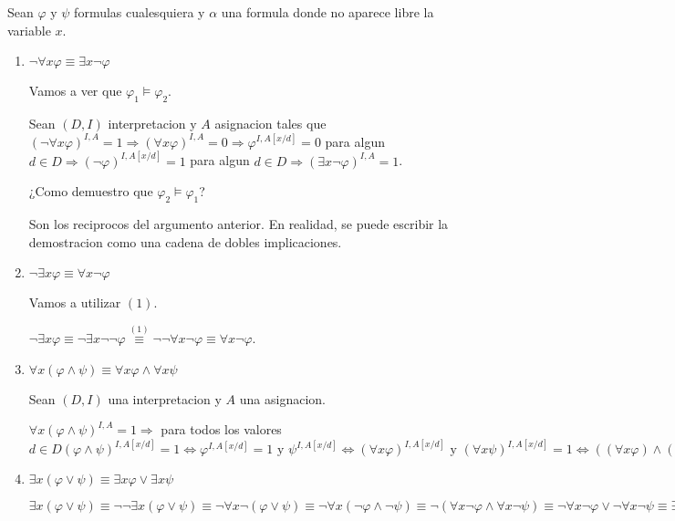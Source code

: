 \begin{example}
	Sean \(\varphi\) y \(\psi \) formulas cualesquiera y \(\alpha\) una formula donde no aparece libre la variable \(x\).
	\begin{enumerate}
		\item \(\neg \forall x \varphi \equiv \exists x \neg \varphi\)

		      Vamos a ver que \(\varphi_1 \vDash \varphi_2 \).

		      Sean \((D,I )\) interpretacion y \(A \) asignacion tales que \((\neg \forall x \varphi)^{I,A} = 1 \Rightarrow (\forall x \varphi)^{I,A} = 0 \Rightarrow \varphi^{I,A[x / d]} = 0 \) para algun \(d \in D \Rightarrow (\neg \varphi)^{I,A[x / d]} = 1 \) para algun \(d \in D \Rightarrow (\exists x \neg \varphi)^{I,A} = 1 \).

		      ¿Como demuestro que \(\varphi_2 \vDash \varphi_1\)?

		      Son los reciprocos del argumento anterior. En realidad, se puede escribir la demostracion como una cadena de dobles implicaciones.

		\item \(\neg \exists x \varphi \equiv \forall x \neg \varphi\)

		      Vamos a utilizar \((1)\).

		      \(\neg \exists x \varphi \equiv \neg \exists x \neg \neg \varphi \overset{(1)}{\equiv} \neg \neg \forall x \neg \varphi \equiv \forall x \neg \varphi\).

		\item \(\forall x (\varphi \wedge \psi) \equiv \forall x \varphi \wedge \forall x \psi \)

		      Sean \((D,I )\) una interpretacion y \(A \) una asignacion.

		      \(\forall  x (\varphi \wedge  \psi)^{I,A} = 1 \Rightarrow \) para todos los valores \(d \in D (\varphi \wedge \psi)^{I,A[x / d]} = 1 \iff \varphi^{I,A[x / d]} = 1 \text{ y } \psi^{I,A[x / d ]} \iff (\forall x \varphi)^{I,A[x / d]} \text{ y } (\forall  x \psi)^{I,A[x / d ]} = 1 \iff ((\forall x \varphi) \wedge (\forall x \psi))^{I,A} = 1      \)

		\item \(\exists  x (\varphi \vee \psi ) \equiv \exists x \varphi \vee  \exists  x \psi \)

		      \(\exists  x (\varphi \vee  \psi) \equiv \neg \neg \exists x (\varphi \vee \psi) \equiv \neg \forall x \neg (\varphi \vee \psi) \equiv \neg \forall x (\neg \varphi \wedge \neg \psi) \equiv \neg (\forall x \neg \varphi \wedge \forall  x \neg \psi) \equiv \neg \forall x \neg \varphi \vee \neg \forall x \neg \psi \equiv \exists x \neg \neg \varphi \vee \exists  x \neg \neg \psi \equiv \exists x \varphi \vee  \exists x \psi \)


\end{enumerate}
\end{example}
